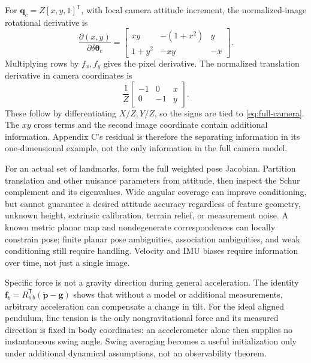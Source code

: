 \documentclass[11pt,a4paper]{article}
\numberwithin{equation}{section}
\begin{document}
For $\boldsymbol q_c=Z[x,y,1]^{\mathsf T}$, with local camera attitude
increment, the normalized-image rotational derivative is
\begin{equation}
 \frac{\partial(x,y)}{\partial\delta\boldsymbol\theta_c}
 =\begin{bmatrix}
 xy&-(1+x^2)&y\\
 1+y^2&-xy&-x
 \end{bmatrix}.
 \label{eq:full-image-rotation}
\end{equation}
Multiplying rows by $f_x,f_y$ gives the pixel derivative. The normalized
translation derivative in camera coordinates is
\begin{equation}
 \frac1Z\begin{bmatrix}-1&0&x\\0&-1&y\end{bmatrix}.
\end{equation}
These follow by differentiating $X/Z,Y/Z$, so the signs are tied to
\eqref{eq:full-camera}. The $xy$ cross terms and the second image
coordinate contain additional information. Appendix C's residual is
therefore the separating information in its one-dimensional example,
not the only information in the full camera model.

For an actual set of landmarks, form the full weighted pose Jacobian.
Partition translation and other nuisance parameters from attitude,
then inspect the Schur complement and its eigenvalues. Wide angular
coverage can improve conditioning, but cannot guarantee a desired
attitude accuracy regardless of feature geometry, unknown height,
extrinsic calibration, terrain relief, or measurement noise. A known
metric planar map and nondegenerate correspondences can locally constrain
pose; finite planar pose ambiguities, association ambiguities, and
weak conditioning still require handling. Velocity and IMU biases require
information over time, not just a single image.

Specific force is not a gravity direction during general acceleration.
The identity $\boldsymbol f_b=R_{wb}^{\mathsf T}
(\ddot{\boldsymbol p}-\boldsymbol g)$ shows that without a model or
additional measurements, arbitrary acceleration can compensate a change
in tilt. For the ideal aligned pendulum, line tension is the only
nongravitational force and its measured direction is fixed in body
coordinates: an accelerometer alone then supplies no instantaneous swing
angle. Swing averaging becomes a useful initialization only under
additional dynamical assumptions, not an observability theorem.
\end{document}
